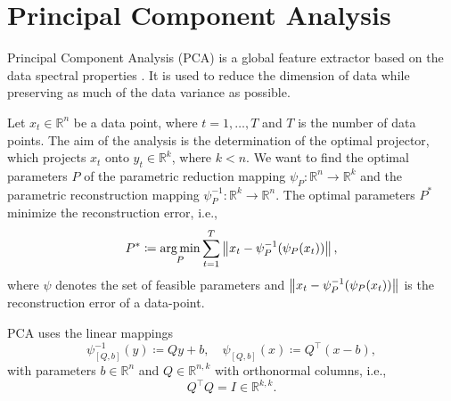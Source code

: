 \section{Principal Component Analysis}
Principal Component Analysis (PCA) is a global feature extractor based on the data spectral properties \cite{pearson1901}. It is used to reduce the dimension of data while preserving as much of the data variance as possible.

Let $x_t \in \mathbb{R}^n$ be a data point, where $t=1,\dots,T$ and $T$ is the number of data points. The aim of the analysis is the determination of the optimal projector, which projects $x_t$ onto $y_t \in \mathbb{R}^k$, where $k < n$. We want to find the optimal parameters $P$ of the parametric reduction mapping $\psi_P: \mathbb{R}^n \rightarrow \mathbb{R}^k$ and the parametric reconstruction mapping $\psi_P^{-1}: \mathbb{R}^k \rightarrow \mathbb{R}^n$. The optimal parameters $P^{*}$ minimize the reconstruction error, i.e.,
\begin{equation}
    P^{*} \coloneqq \operatorname*{arg\,min}_{P} \sum_{t=1}^T \left\lVert x_t - \psi_P^{-1}(\psi_P(x_t))\right\rVert,
    \label{eq:mapping_optimization}
\end{equation}
where $\psi$ denotes the set of feasible parameters and $\left\lVert x_t - \psi_P^{-1}(\psi_P(x_t))\right\rVert$ is the reconstruction error of a data-point.

PCA uses the linear mappings
\begin{equation}
    \psi_{[Q,b]}^{-1}(y) \coloneqq Qy+b,\quad \psi_{[Q,b]}(x) \coloneqq Q^{\top}(x-b),
    \label{eq:pca_mappings}
\end{equation}
with parameters $b \in \mathbb{R}^n$ and $Q \in \mathbb{R}^{n,k}$ with orthonormal columns, i.e.,
\begin{equation}
    Q^{\top}Q = I \in \mathbb{R}^{k,k}.
    \label{eq:pca_identity}
\end{equation}

